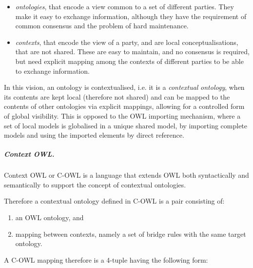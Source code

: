 \documentclass{fast_latex}
\begin{document}
\begin{itemize}
\item \textit{ontologies}, that encode a view common to a set of
different parties. They make it easy to exchange information, although
they have the requirement of common consensus and the problem of hard
maintenance. 
\item \textit{contexts}, that encode the view of a party, and are local
conceptualisations, that are not shared. These are easy to maintain,
and no consensus is required, but need explicit mapping among the
contexts of different parties to be able to exchange information. 
\end{itemize}
In this vision, an ontology is contextualised, i.e. it is a
\textit{contextual} \textit{ontology}, when its contents are kept local
(therefore not shared) and can be mapped to the contents of other
ontologies via explicit mappings, allowing for a controlled form of
global visibility. This is opposed to the OWL importing mechanism,
where a set of local models is globalised in a unique shared model, by
importing complete models and using the imported elements by direct
reference. 

\subparagraph{Context OWL.}
Context OWL or C-OWL is a language that extends OWL both syntactically
and semantically to support the concept of contextual ontologies. 

Therefore a contextual ontology defined in C-OWL is a pair consisting
of: 

\begin{enumerate}
\item an OWL ontology, and 
\item mapping between contexts, namely a set of bridge rules with the
same target ontology. 
\end{enumerate}
A C-OWL mapping therefore is a 4-tuple having the following form: 
\end{document}

